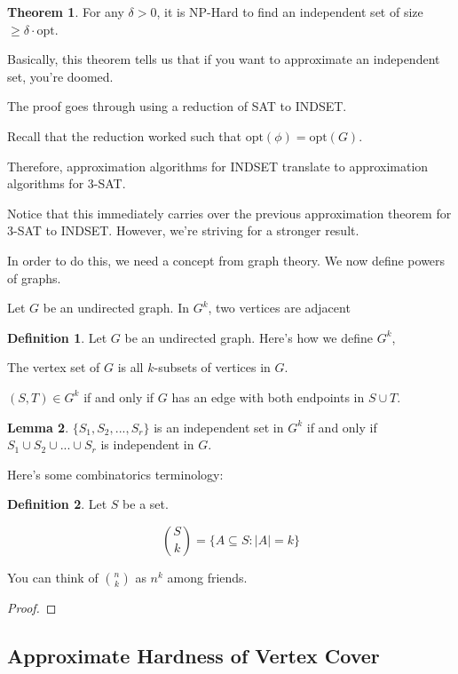 \documentclass{article}
\theoremstyle{definition}
\newtheorem{definition}{Definition}
\newtheorem{theorem}{Theorem}[section]
\newtheorem{lemma}[theorem]{Lemma}
\newcommand{\opt}{\text{opt}}
\begin{document}
\begin{theorem}
    For any $\delta > 0$, it is NP-Hard to find
    an independent set of size $\geq \delta \cdot \opt$.
\end{theorem}

Basically, this theorem tells us that if you want to approximate
an independent set, you're doomed.

The proof goes through using a reduction of SAT to INDSET.

Recall that the reduction worked such that $\opt(\phi) = \opt(G)$.

Therefore, approximation algorithms for INDSET translate to
approximation algorithms for 3-SAT.

Notice that this immediately carries over the previous approximation
theorem for 3-SAT to INDSET. However, we're striving for a stronger result.

In order to do this, we need a concept from graph theory.
We now define powers of graphs.

Let $G$ be an undirected graph. In $G^{k}$,
two vertices are adjacent 

\begin{definition}
    Let $G$ be an undirected graph. Here's how we define $G^{k}$,

    The vertex set of $G$ is all $k$-subsets of vertices in $G$.

    $(S,T) \in G^{k}$ if and only if $G$ has an edge with both endpoints in $S \cup T$.
\end{definition}

\begin{lemma}
    $\{S_{1},S_{2},...,S_{r}\}$ is an independent
    set in $G^{k}$ if and only if $S_{1} \cup S_{2} \cup ... \cup S_{r}$
    is independent in $G$.
\end{lemma}

Here's some combinatorics terminology:

\begin{definition}
    Let $S$ be a set. 

    \[ {S \choose k}= \{ A \subseteq S: \lvert A \rvert = k \} \]
\end{definition}

You can think of ${n \choose k}$ as $n^k$ among friends.

\begin{proof}
    
\end{proof}

\subsection{Approximate Hardness of Vertex Cover}
\end{document}
